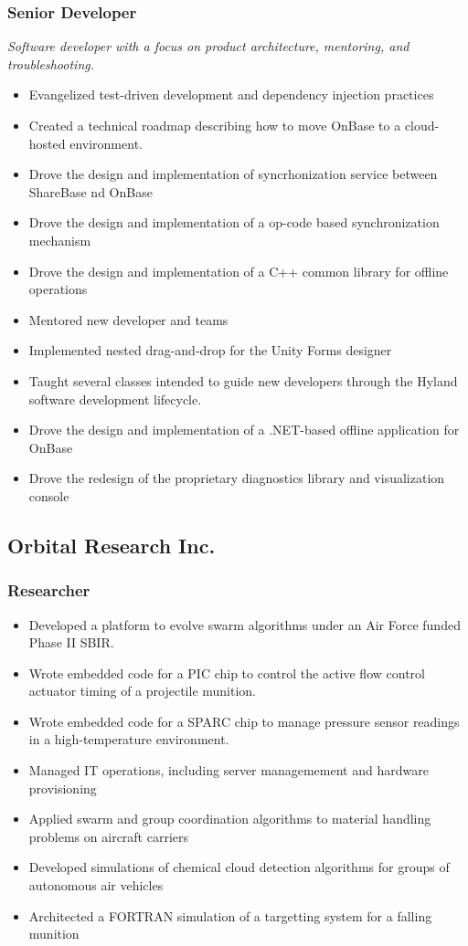 \documentclass{cv_style}
\begin{document}
			\subsubsection*{Senior Developer}
			\textit{Software developer with a focus on product architecture, mentoring, and troubleshooting.}
			\begin{itemize}
				\item Evangelized test-driven development and dependency injection practices
				\item Created a technical roadmap describing how to move OnBase to a cloud-hosted environment.
				\item Drove the design and implementation of syncrhonization service between ShareBase nd OnBase
				\item Drove the design and implementation of a op-code based synchronization mechanism
				\item Drove the design and implementation of a C++ common library for offline operations
				\item Mentored new developer and teams
				\item Implemented nested drag-and-drop for the Unity Forms designer
				\item Taught several classes intended to guide new developers through the Hyland software development lifecycle.
				\item Drove the design and implementation of a .NET-based offline application for OnBase
				\item Drove the redesign of the proprietary diagnostics library and visualization console
			\end{itemize}

		\subsection{Orbital Research Inc.}
			\subsubsection*{Researcher}
			\begin{itemize}
				\item Developed a platform to evolve swarm algorithms under an Air Force funded Phase II SBIR.
				\item Wrote embedded code for a PIC chip to control the active flow control actuator timing of a projectile munition. 
				\item Wrote embedded code for a SPARC chip to manage pressure sensor readings in a high-temperature environment.
				\item Managed IT operations, including server managemement and hardware provisioning
				\item Applied swarm and group coordination algorithms to material handling problems on aircraft carriers
				\item Developed simulations of chemical cloud detection algorithms for groups of autonomous air vehicles
				\item Architected a FORTRAN simulation of a targetting system for a falling munition
			\end{itemize}
\end{document}
